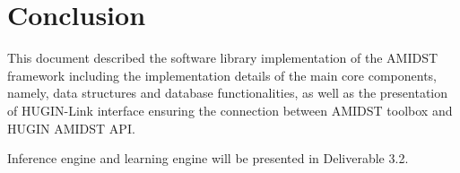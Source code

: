 \section{Conclusion}\label{sec:Conclusion}

This document described the software library implementation of the AMIDST framework including the implementation details of the main core components, namely, data structures and database functionalities, as well as the presentation of HUGIN-Link interface ensuring the connection between AMIDST toolbox and HUGIN AMIDST API.

Inference engine and learning engine will be presented in Deliverable 3.2.